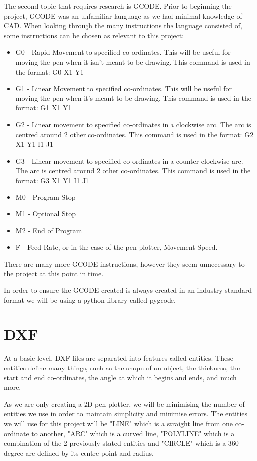 		The second topic that requires research is GCODE. Prior to beginning the project, GCODE was an unfamiliar language as we had minimal knowledge of CAD. When looking through the many instructions the language consisted of, some instructions can be chosen as relevant to this project:
			\begin{itemize}
				\item G0 - Rapid Movement to specified co-ordinates. This will be useful for moving the pen when it isn't meant to be drawing. This command is used in the format: G0 X1 Y1
				\item G1 - Linear Movement to specified co-ordinates. This will be useful for moving the pen when it's meant to be drawing. This command is used in the format: G1 X1 Y1
				\item G2 - Linear movement to specified co-ordinates in a clockwise arc. The arc is centred around 2 other co-ordinates. This command is used in the format: G2 X1 Y1 I1 J1
				\item G3 - Linear movement to specified co-ordinates in a counter-clockwise arc. The arc is centred around 2 other co-ordinates. This command is used in the format: G3 X1 Y1 I1 J1
				\item M0 - Program Stop
				\item M1 - Optional Stop
				\item M2 - End of Program
				\item F - Feed Rate, or in the case of the pen plotter, Movement Speed.
			\end{itemize}
		
		There are many more GCODE instructions, however they seem unnecessary to the project at this point in time.
		
		In order to ensure the GCODE created is always created in an industry standard format we will be using a python library called pygcode.
	
	\section{DXF}
		\label{sec:dxf}

		At a basic level, DXF files are separated into features called entities. These entities define many things, such as the shape of an object, the thickness, the start and end co-ordinates, the angle at which it begins and ends, and much more.
		
		As we are only creating a 2D pen plotter, we will be minimising the number of entities we use in order to maintain simplicity and minimise errors. The entities we will use for this project will be "LINE" which is a straight line from one co-ordinate to another, "ARC" which is a curved line, "POLYLINE" which is a combination of the 2 previously stated entities and "CIRCLE" which is a 360 degree arc defined by its centre point and radius.

